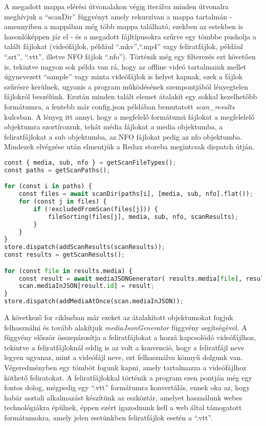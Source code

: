 A megadott mappa elérési útvonalakon végig iterálva minden útvonalra meghívjuk a ``scanDir'' függvényt amely rekurzívan a mappa tartalmán - amennyiben a mappában még több mappa található, ezekben az estekben is hasonlóképpen jár el - és a megadott fájltípusokra szűrve egy tömbbe pusholja a talált fájlokat (videófájlok, például ``.mkv'',``.mp4'' vagy feliratfájlok, például ``.srt'', ``.vtt'', illetve NFO fájlok ``.nfo''). Történik még egy filterezés ezt követően is, tekintve nagyon sok példa van rá, hogy az offline videó tartalmaink mellet úgynevezett ``sample'' vagy minta videófájlok is helyet kapnak, ezek a fájlok szűrésre kerülnek, ugyanis a program működésének szempontjából lényegtelen fájlokról beszélünk. Ezután minden talált elemet átalakít egy sokkal kezelhetőbb formátumra, a fentebb már config.json példában bemutatott {\it scan\_results} kulcsban. A lényeg itt annyi, hogy a megfelelő formátumú fájlokat a megfelelelő objektumra szortírozzuk, tehát média fájlokat a media objektumba, a feliratfájlokat a sub objektumba, az NFO fájlokat pedig az nfo objektumba. Mindezek elvégzése után elmentjük a Redux storeba megintcsak dispatch útján.

\begin{lstlisting}[language={python}]
const { media, sub, nfo } = getScanFileTypes();
const paths = getScanPaths();

for (const i in paths) {
    const files = await scanDir(paths[i], [media, sub, nfo].flat());
    for (const j in files) {
        if (!excludedFromScan(files[j])) {
            fileSorting(files[j], media, sub, nfo, scanResults);
        }
    }
}
store.dispatch(addScanResults(scanResults));
const results = getScanResults();

for (const file in results.media) {
    const result = await mediaJSONGenerator( results.media[file], results );
    scan.mediaInJSON[result.id] = result;
}
store.dispatch(addMediaAtOnce(scan.mediaInJSON));
\end{lstlisting}

A következő for ciklusban már ezeket az átalakított objektumokat fogjuk felhasználni és tovább alakítjuk  {\it mediaJsonGenerator} függvény segítségével. A függvény először összepárosítja a feliratfájlokat a hozzá kapcsolódó videófájlhoz, tekintve a feliratfájloknál eddig is az volt a konvenció, hogy a feliratfájl neve legyen ugyanaz, mint a videófájl neve, ezt felhasználva könnyű dolgunk van. Végeredményben egy tömböt fogunk kapni, amely tartalmazza a videófájlhoz köthető feliratokat. A feliratfájlokkal történik a program ezen pontján még egy fontos dolog, mégpedig egy ``.vtt'' formátumra konvertálás, ennek oka az, hogy habár asztali alkalmazást készítünk az eszköztár, amelyet használunk webes technológiákra épülnek, éppen ezért igazodnunk kell a web által támogatott formátumokra, amely jelen esetünkben feliratfájlok esetén a ``.vtt''.

